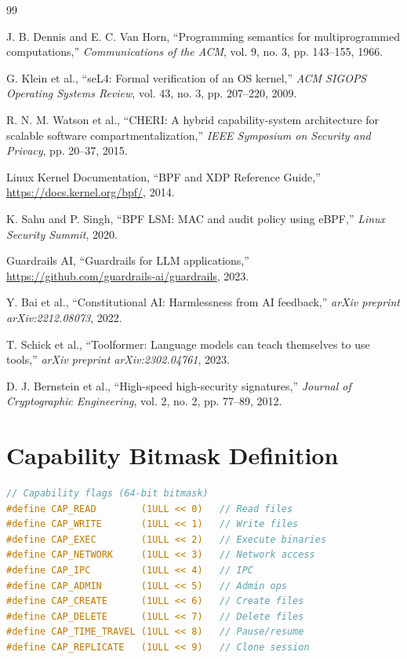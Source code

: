 \documentclass[11pt,a4paper]{article}
\begin{document}
\begin{thebibliography}{99}

J. B. Dennis and E. C. Van Horn,
``Programming semantics for multiprogrammed computations,''
\textit{Communications of the ACM}, vol. 9, no. 3, pp. 143--155, 1966.

G. Klein et al.,
``seL4: Formal verification of an OS kernel,''
\textit{ACM SIGOPS Operating Systems Review}, vol. 43, no. 3, pp. 207--220, 2009.

R. N. M. Watson et al.,
``CHERI: A hybrid capability-system architecture for scalable software compartmentalization,''
\textit{IEEE Symposium on Security and Privacy}, pp. 20--37, 2015.

Linux Kernel Documentation,
``BPF and XDP Reference Guide,''
\url{https://docs.kernel.org/bpf/}, 2014.

K. Sahu and P. Singh,
``BPF LSM: MAC and audit policy using eBPF,''
\textit{Linux Security Summit}, 2020.

Guardrails AI,
``Guardrails for LLM applications,''
\url{https://github.com/guardrails-ai/guardrails}, 2023.

Y. Bai et al.,
``Constitutional AI: Harmlessness from AI feedback,''
\textit{arXiv preprint arXiv:2212.08073}, 2022.

T. Schick et al.,
``Toolformer: Language models can teach themselves to use tools,''
\textit{arXiv preprint arXiv:2302.04761}, 2023.

D. J. Bernstein et al.,
``High-speed high-security signatures,''
\textit{Journal of Cryptographic Engineering}, vol. 2, no. 2, pp. 77--89, 2012.

\end{thebibliography}


\newpage
\appendix

\section{Capability Bitmask Definition}

\begin{lstlisting}[language=C]
// Capability flags (64-bit bitmask)
#define CAP_READ        (1ULL << 0)   // Read files
#define CAP_WRITE       (1ULL << 1)   // Write files
#define CAP_EXEC        (1ULL << 2)   // Execute binaries
#define CAP_NETWORK     (1ULL << 3)   // Network access
#define CAP_IPC         (1ULL << 4)   // IPC
#define CAP_ADMIN       (1ULL << 5)   // Admin ops
#define CAP_CREATE      (1ULL << 6)   // Create files
#define CAP_DELETE      (1ULL << 7)   // Delete files
#define CAP_TIME_TRAVEL (1ULL << 8)   // Pause/resume
#define CAP_REPLICATE   (1ULL << 9)   // Clone session
\end{lstlisting}
\end{document}
